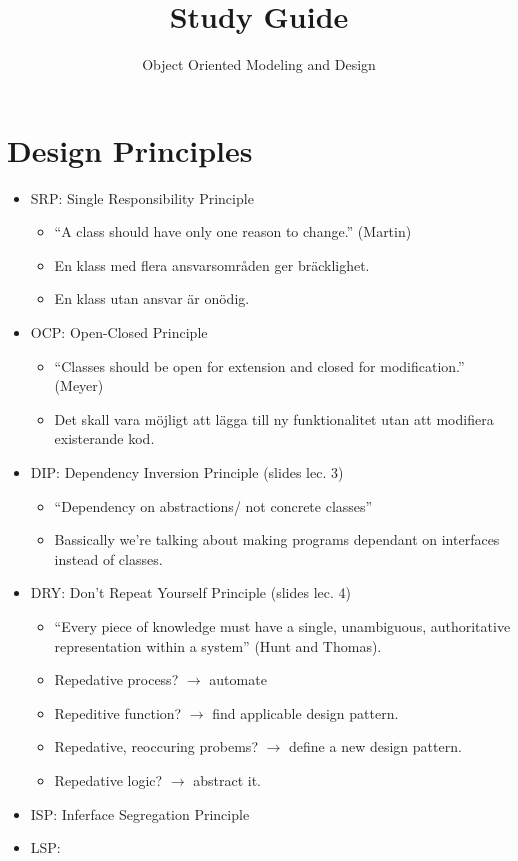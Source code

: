 \documentclass[11pt]{amsart}
\title{Study Guide}
\author{Object Oriented Modeling and Design}
\begin{document}
\maketitle
\lstset{language=Java}

\section*{Design Principles}

\begin{itemize}
\item SRP: Single Responsibility Principle
	\begin{itemize}
	  \item ``A class should have only one reason to change.'' (Martin)
	  \item En klass med flera ansvarsområden ger bräcklighet.
	  \item En klass utan ansvar är onödig.
	\end{itemize}
\item OCP: Open-Closed Principle
	\begin{itemize}
	  \item ``Classes should be open for extension and closed for modification.''
	  (Meyer)
	  \item Det skall vara möjligt att lägga till ny funktionalitet utan att
	  modifiera existerande kod.
	\end{itemize}
\item DIP: Dependency Inversion Principle (slides lec. 3) %
	\begin{itemize}
	  \item ``Dependency on abstractions/ not concrete classes''
	  \item Bassically we're talking about making programs dependant on interfaces
	  instead of classes. 
	\end{itemize}
\item DRY: Don't Repeat Yourself Principle (slides lec. 4)
	\begin{itemize}
	  \item ``Every piece of knowledge must have a single, unambiguous,
	  authoritative representation within a system'' (Hunt and Thomas).
	  \item Repedative process? $\rightarrow$ automate
	  \item Repeditive function? $\rightarrow$ find applicable design pattern.
	  \item Repedative, reoccuring probems? $\rightarrow$ define a new design
	  pattern.
	  \item Repedative logic? $\rightarrow$ abstract it.
	\end{itemize}
\item ISP: Inferface Segregation Principle
\item LSP: 
\end{itemize}
\end{document}

